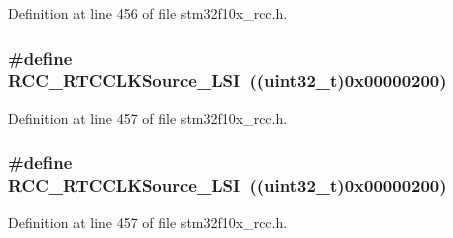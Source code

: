 Definition at line 456 of file stm32f10x\+\_\+rcc.\+h.

\subsubsection[{\texorpdfstring{R\+C\+C\+\_\+\+R\+T\+C\+C\+L\+K\+Source\+\_\+\+L\+SI}{RCC_RTCCLKSource_LSI}}]{\setlength{\rightskip}{0pt plus 5cm}\#define R\+C\+C\+\_\+\+R\+T\+C\+C\+L\+K\+Source\+\_\+\+L\+SI~(({\bf uint32\+\_\+t})0x00000200)}\hypertarget{group___r_t_c__clock__source_ga7758c87e4584bfa76cb99c726b7162c3}{}\label{group___r_t_c__clock__source_ga7758c87e4584bfa76cb99c726b7162c3}


Definition at line 457 of file stm32f10x\+\_\+rcc.\+h.

\subsubsection[{\texorpdfstring{R\+C\+C\+\_\+\+R\+T\+C\+C\+L\+K\+Source\+\_\+\+L\+SI}{RCC_RTCCLKSource_LSI}}]{\setlength{\rightskip}{0pt plus 5cm}\#define R\+C\+C\+\_\+\+R\+T\+C\+C\+L\+K\+Source\+\_\+\+L\+SI~(({\bf uint32\+\_\+t})0x00000200)}\hypertarget{group___r_t_c__clock__source_ga7758c87e4584bfa76cb99c726b7162c3}{}\label{group___r_t_c__clock__source_ga7758c87e4584bfa76cb99c726b7162c3}


Definition at line 457 of file stm32f10x\+\_\+rcc.\+h.

